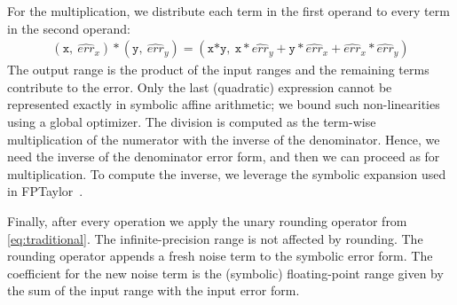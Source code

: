 For the multiplication, we distribute each term in the first operand to every term in the second operand:
\begin{align}
\nonumber
(\texttt{x},\:\widehat{err}_x)*(\texttt{y}, \:\widehat{err}_y)=(\texttt{x*y},\:\texttt{x}*\widehat{err}_y + \texttt{y}*\widehat{err}_x + \widehat{err}_x*\widehat{err}_y)
\end{align}
The output range is the product of the input ranges and the remaining terms contribute to the error.
%
Only the last (quadratic) expression cannot be represented exactly in symbolic affine arithmetic;
we bound such non-linearities using a global optimizer.
%
The division is computed as the term-wise multiplication of the numerator with the inverse of the denominator.
%
Hence, we need the inverse of the denominator error form, and then we can proceed as for multiplication.
%
To compute the inverse, we leverage the symbolic expansion used in FPTaylor~\cite{solovyev2018rigorous}.

Finally, after every operation we apply the unary rounding operator from \cref{eq:traditional}. The infinite-precision range is not affected by rounding. The rounding operator appends a fresh noise term to the symbolic error form. 
The coefficient for the new noise term is the (symbolic) floating-point range given by the sum of the input range with the input error form.